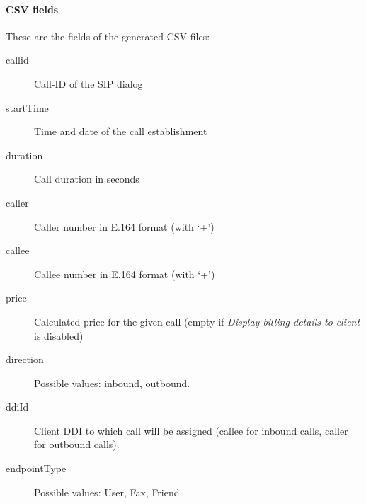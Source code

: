 \documentclass[letterpaper,10pt,english]{sphinxmanual}
\begin{document}
\paragraph{CSV fields}
\label{administration_portal/client/vpbx/calls/call_csv_schedulers:csv-fields}
These are the fields of the generated CSV files:
\begin{description}
\item[{callid}] \leavevmode{}\label{administration_portal/client/vpbx/calls/call_csv_schedulers:term-callid}
Call-ID of the SIP dialog

\item[{startTime}] \leavevmode{}\label{administration_portal/client/vpbx/calls/call_csv_schedulers:term-starttime}
Time and date of the call establishment

\item[{duration}] \leavevmode{}\label{administration_portal/client/vpbx/calls/call_csv_schedulers:term-duration}
Call duration in seconds

\item[{caller}] \leavevmode{}\label{administration_portal/client/vpbx/calls/call_csv_schedulers:term-caller}
Caller number in E.164 format (with `+')

\item[{callee}] \leavevmode{}\label{administration_portal/client/vpbx/calls/call_csv_schedulers:term-callee}
Callee number in E.164 format (with `+')

\item[{price}] \leavevmode{}\label{administration_portal/client/vpbx/calls/call_csv_schedulers:term-price}
Calculated price for the given call (empty if \emph{Display billing details to client} is disabled)

\item[{direction}] \leavevmode{}\label{administration_portal/client/vpbx/calls/call_csv_schedulers:term-17}
Possible values: inbound, outbound.

\item[{ddiId}] \leavevmode{}\label{administration_portal/client/vpbx/calls/call_csv_schedulers:term-ddiid}
Client DDI to which call will be assigned (callee for inbound calls, caller for outbound calls).

\item[{endpointType}] \leavevmode{}\label{administration_portal/client/vpbx/calls/call_csv_schedulers:term-endpointtype}
Possible values: User, Fax, Friend.


\end{description}
\end{document}
